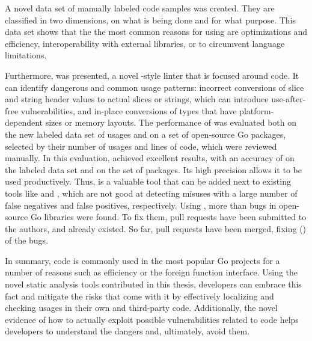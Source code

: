 A novel data set of \numberLabeledCodeSnippets{} manually labeled \unsafe{} code samples was created.
They are classified in two dimensions, on what is being done and for what purpose.
This data set shows that the the most common reasons for using \unsafe{} are optimizations and efficiency,
interoperability with external libraries, or to circumvent language limitations.

Furthermore, \toolSafer{} was presented, a novel \toolVet{}-style linter that is focused around \unsafe{} code.
It can identify  dangerous and common usage patterns: incorrect conversions of slice and string header
values to actual slices or strings, which can introduce use-after-free vulnerabilities, and in-place conversions of
types that have platform-dependent sizes or memory layouts.
The performance of \toolSafer{} was evaluated both on the new labeled data set of \unsafe{} usages and on a set of
open-source Go packages, selected by their number of \unsafe{} usages and lines of code, which were reviewed manually.
In this evaluation, \toolSafer{} achieved excellent results, with an accuracy of
\goSaferEvaluationDatasetGosaferAccuracy{} on the labeled data set and \goSaferEvaluationPackagesGosaferAccuracy{} on
the set of packages.
Its high precision allows it to be used productively.
Thus, \toolSafer{} is a valuable tool that can be added next to existing tools like \toolVet{} and \toolGosec{}, which
are not good at detecting \unsafe{} misuses with a large number of false negatives and false positives, respectively.
Using \toolSafer{}, more than \numberBugsFixedRounded{} bugs in open-source Go libraries were found.
To fix them, \numberPRs{} pull requests have been submitted to the authors, and  already existed.
So far, \numberPRsMerged{} pull requests have been merged, fixing \numberBugsMerged{} (\fractionBugsMerged{}) of the
bugs.

In summary, \unsafe{} code is commonly used in the most popular Go projects for a number of reasons such as efficiency
or the foreign function interface.
Using the novel static analysis tools contributed in this thesis, developers can embrace this fact and mitigate the
risks that come with it by effectively localizing and checking \unsafe{} usages in their own and third-party code.
Additionally, the novel evidence of how to actually exploit possible vulnerabilities related to \unsafe{} code helps
developers to understand the dangers and, ultimately, avoid them.
